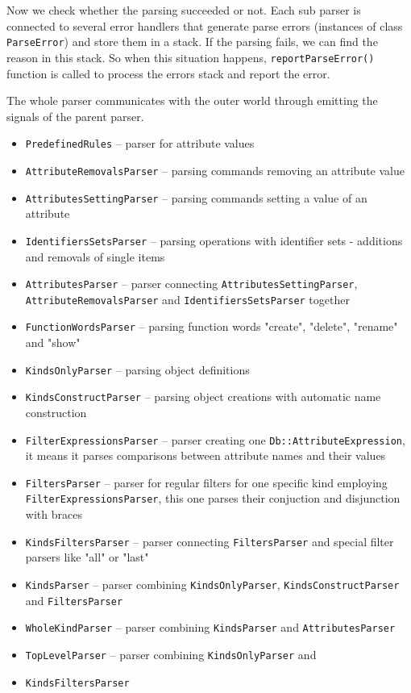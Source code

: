 \documentclass[deska]{subfiles}
\begin{document}
Now we check whether the parsing succeeded or not. Each sub parser is connected to several error handlers that
generate parse errors (instances of class {\tt ParseError}) and store them in a stack. If the parsing fails, we can find
the reason in this stack. So when this situation happens, {\tt reportParseError()} function is called to process
the errors stack and report the error.

The whole parser communicates with the outer world through emitting the signals of the parent parser.

\begin{itemize}
    \item {\tt PredefinedRules} -- parser for attribute values
    \item {\tt AttributeRemovalsParser} -- parsing commands removing an attribute value
    \item {\tt AttributesSettingParser} -- parsing commands setting a value of an attribute 
    \item {\tt IdentifiersSetsParser} -- parsing operations with identifier sets - additions and removals of single items
    \item {\tt AttributesParser} -- parser connecting {\tt AttributesSettingParser}, {\tt AttributeRemovalsParser} and
                                    {\tt IdentifiersSetsParser} together 
    \item {\tt FunctionWordsParser} -- parsing function words "create", "delete", "rename" and "show"
    \item {\tt KindsOnlyParser} -- parsing object definitions
    \item {\tt KindsConstructParser} -- parsing object creations with automatic name construction
    \item {\tt FilterExpressionsParser} -- parser creating one {\tt Db::AttributeExpression}, it means it parses comparisons between
                                           attribute names and their values
    \item {\tt FiltersParser} -- parser for regular filters for one specific kind employing {\tt FilterExpressionsParser}, this one parses
                                 their conjuction and disjunction with braces 
    \item {\tt KindsFiltersParser} -- parser connecting {\tt FiltersParser} and special filter parsers like "all" or "last" 
    \item {\tt KindsParser} -- parser combining {\tt KindsOnlyParser}, {\tt KindsConstructParser} and {\tt FiltersParser}
    \item {\tt WholeKindParser} -- parser combining {\tt KindsParser} and {\tt AttributesParser}  
    \item {\tt TopLevelParser} -- parser combining {\tt KindsOnlyParser} and \item {\tt KindsFiltersParser}
\end{itemize}
\end{document}

